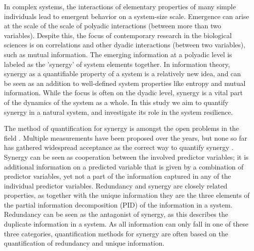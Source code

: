 \documentclass[../main.tex]{subfiles}
\begin{document}
In complex systems, the interactions of elementary properties of many simple individuals lead to emergent behavior on a system-size scale.
Emergence can arise at the scale of the scale of polyadic interactions (between more than two variables).
Despite this, the focus of contemporary research in the biological sciences is on correlations and other dyadic interactions (between two variables), such as mutual information.
The emerging information at a polyadic level is labeled as the 'synergy' of system elements together.
In information theory, synergy as a quantifiable property of a system is a relatively new idea, and can be seen as an addition to well-defined system properties like entropy and mutual information.
While the focus is often on the dyadic level, synergy is a vital part of the dynamics of the system as a whole.
In this study we aim to quantify synergy in a natural system, and investigate its role in the system resilience.

The method of quantification for synergy is amongst the open problems in the field \cite{griffith2011quantifying, olbrich2015information}.
Multiple measurements have been proposed over the years, but none so far has gathered widespread acceptance as the correct way to quantify synergy \cite{griffith2014quantifying, olbrich2015information}.
Synergy can be seen as cooperation between the involved predictor variables; it is additional information on a predicted variable that is given by a combination of predictor variables, yet not a part of the information captured in any of the individual predictor variables.
Redundancy and synergy are closely related properties, as together with the unique information they are the three elements of the partial information decomposition (PID) of the information in a system.
Redundancy can be seen as the antagonist of synergy, as this describes the duplicate information in a system.
As all information can only fall in one of these three categories, quantification methods for synergy are often based on the quantification of redundancy and unique information.
\end{document}
